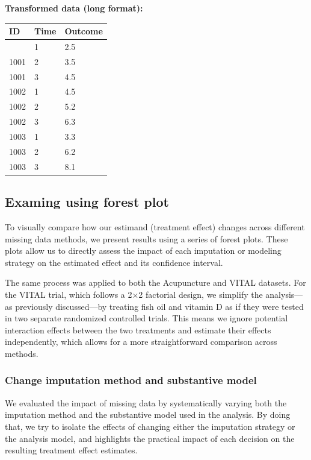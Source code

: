 \documentclass{article}
\begin{document}
\textbf{Transformed data (long format):}

\begin{longtable}[]{@{}lll@{}}
\toprule\noalign{}
ID & Time & Outcome \\
\midrule\noalign{}
\endhead
\bottomrule\noalign{}
\endlastfoot
1001 & 1 & 2.5 \\
1001 & 2 & 3.5 \\
1001 & 3 & 4.5 \\
1002 & 1 & 4.5 \\
1002 & 2 & 5.2 \\
1002 & 3 & 6.3 \\
1003 & 1 & 3.3 \\
1003 & 2 & 6.2 \\
1003 & 3 & 8.1 \\
\end{longtable}

\subsection{Examing using forest plot}\label{examing-using-forest-plot}

To visually compare how our estimand (treatment effect) changes across
different missing data methods, we present results using a series of
forest plots. These plots allow us to directly assess the impact of each
imputation or modeling strategy on the estimated effect and its
confidence interval.

The same process was applied to both the Acupuncture and VITAL datasets.
For the VITAL trial, which follows a 2×2 factorial design, we simplify
the analysis---as previously discussed---by treating fish oil and
vitamin D as if they were tested in two separate randomized controlled
trials. This means we ignore potential interaction effects between the
two treatments and estimate their effects independently, which allows
for a more straightforward comparison across methods.

\subsubsection{Change imputation method and substantive
model}\label{change-imputation-method-and-substantive-model}

We evaluated the impact of missing data by systematically varying both
the imputation method and the substantive model used in the analysis. By
doing that, we try to isolate the effects of changing either the
imputation strategy or the analysis model, and highlights the practical
impact of each decision on the resulting treatment effect estimates.
\end{document}
